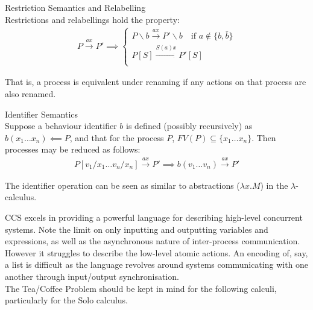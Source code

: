     \begin{definition}{Restriction Semantics and Relabelling\\}
        Restrictions and relabellings hold the property:
        \begin{align*}
            P \xrightarrow{a x} P' \implies
            \begin{cases}
                P \backslash b \xrightarrow{a x} P ' \backslash b \quad \text{if } a \notin \{b, \bar{b}\}\\
                P[S] \xrightarrow{S(a) x} P'[S] \\
            \end{cases}
        \end{align*}
    \end{definition}
    That is, a process is equivalent under renaming if any actions on that process are also renamed.


    \begin{definition}{Identifier Semantics\\}
        Suppose a behaviour identifier $b$ is defined (possibly recursively) as $b(x_1 \ldots x_n) \impliedby P$, and that for the process $P$, $FV(P) \subseteq \{x_1 \ldots x_n\}$.
        Then processes may be reduced as follows:
        \begin{align*}
            P[v_1 / x_1 \ldots v_n / x_n] \xrightarrow{a x} P' \implies
            b(v_1 \ldots v_n) \xrightarrow{a x} P'
        \end{align*}
    \end{definition}
    The identifier operation can be seen as similar to abstractions ($\lambda x . M$) in the $\lambda$-calculus.


    \begin{remarks}
        CCS excels in providing a powerful language for describing high-level concurrent systems.
        Note the limit on only inputting and outputting variables and expressions, as well as the asynchronous nature of inter-process communication.
        However it struggles to describe the low-level atomic actions.
        An encoding of, say, a list is difficult as the language revolves around systems communicating with one another through input/output synchronisation. \\

        The Tea/Coffee Problem should be kept in mind for the following calculi, particularly for the Solo calculus.
    \end{remarks}

